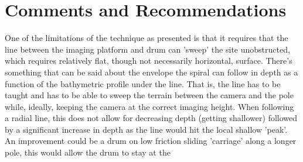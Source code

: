\section{Comments and Recommendations}


One of the limitations of the technique as presented is that it requires that the line between the imaging platform and drum can 'sweep' the site unobstructed, which requires relatively flat, though not necessarily horizontal, surface. There's something that can be said about the envelope the spiral can follow in depth as a function of the bathymetric profile under the line. That is, the line has to be taught and has to be able to sweep the terrain between the camera and the pole while, ideally, keeping the camera at the correct imaging height. When following a radial line, this does not allow for decreasing depth (getting shallower) followed by a significant increase in depth as the line would hit the local shallow 'peak'. An improvement could be a drum on low friction sliding 'carriage' along a longer pole, this would allow the drum to stay at the 